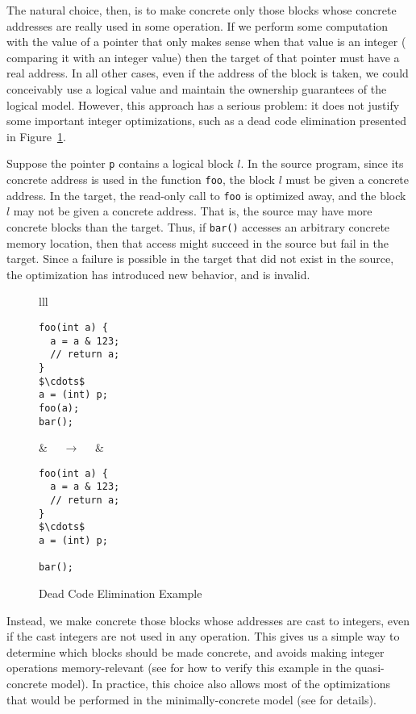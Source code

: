 The natural choice, then, is to make concrete only those blocks whose concrete addresses are really used in some operation. If we perform some computation with the value of a pointer that only makes sense when that value is an integer (\eg %
comparing it with an integer value) then the target of that pointer must have a real address. In all other cases, even if the address of the block is taken, we could conceivably use a logical value and maintain the ownership guarantees of the logical model. However, this approach has a serious problem: it does not justify some important integer optimizations, such as a dead code elimination presented in Figure~\ref{code:dce}.

Suppose the pointer \texttt{p} contains a logical block $l$. In the source program, since its concrete address is used in the function
\texttt{foo}, the block $l$ must be given a concrete address. In the target, the read-only call to \texttt{foo} is optimized away, and the block $l$ may not be given a concrete address. That is, the source may have more concrete blocks than the target. Thus, if \texttt{bar()} accesses an arbitrary concrete memory location, then that access might succeed in the source but fail in the target. Since a failure is possible in the target that did not exist in the source, the optimization has introduced new behavior, and is invalid.

\begin{figure}[t]
\center
\begin{tabular}{lll}
\begin{lstlisting}
foo(int a) {
  a = a & 123;
  // return a;
}
$\cdots$
a = (int) p;
foo(a);
bar();
\end{lstlisting}
&
$\quad\rightarrow\quad$
&
\begin{lstlisting}
foo(int a) {
  a = a & 123;
  // return a;
}
$\cdots$
a = (int) p;

bar();
\end{lstlisting}
\end{tabular}
\caption{Dead Code Elimination Example}\label{code:dce}
\end{figure}

Instead, we make concrete those blocks whose addresses are cast to integers, 
even if the cast integers are not used in any operation. This gives us a simple way to determine which blocks should be made concrete, and avoids making integer operations memory-relevant 
(see  for how to verify this example in the
quasi-concrete model). In practice, this choice also allows most of the optimizations that would be performed in the minimally-concrete model (see  for details).

